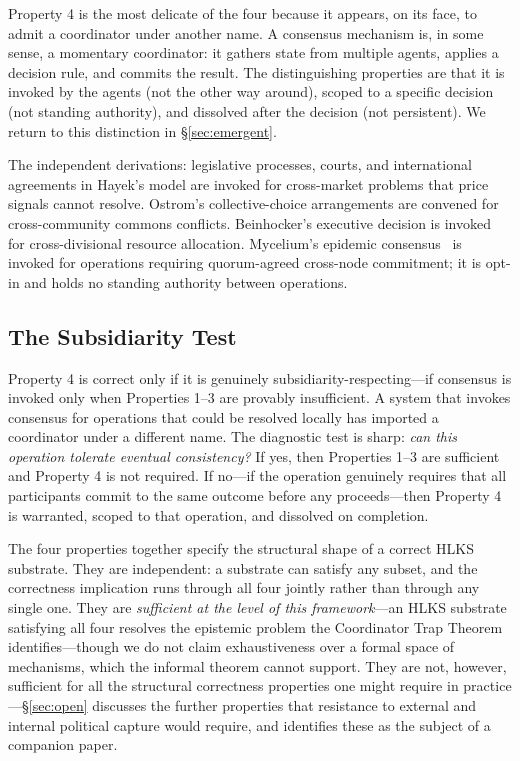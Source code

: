 \documentclass[11pt]{article}
\theoremstyle{definition}
\theoremstyle{plain}
\theoremstyle{plain}
\begin{document}
Property 4 is the most delicate of the four because it appears, on its face,
to admit a coordinator under another name. A consensus mechanism is, in some
sense, a momentary coordinator: it gathers state from multiple agents, applies
a decision rule, and commits the result. The distinguishing properties are
that it is invoked by the agents (not the other way around), scoped to a
specific decision (not standing authority), and dissolved after the decision
(not persistent). We return to this distinction in \S\ref{sec:emergent}.

The independent derivations: legislative processes, courts, and international
agreements in Hayek's model are invoked for cross-market problems that price
signals cannot resolve. Ostrom's collective-choice arrangements are convened
for cross-community commons conflicts. Beinhocker's executive decision is
invoked for cross-divisional resource allocation. Mycelium's epidemic
consensus~\cite{nicholson2026} is invoked for operations requiring
quorum-agreed cross-node commitment; it is opt-in and holds no standing
authority between operations.

\subsection{The Subsidiarity Test}

Property 4 is correct only if it is genuinely subsidiarity-respecting---if
consensus is invoked only when Properties 1--3 are provably insufficient. A
system that invokes consensus for operations that could be resolved locally
has imported a coordinator under a different name. The diagnostic test is
sharp: \emph{can this operation tolerate eventual consistency?} If yes, then
Properties 1--3 are sufficient and Property 4 is not required. If no---if the
operation genuinely requires that all participants commit to the same outcome
before any proceeds---then Property 4 is warranted, scoped to that operation,
and dissolved on completion.

The four properties together specify the structural shape of a correct HLKS
substrate. They are independent: a substrate can satisfy any subset, and the
correctness implication runs through all four jointly rather than through any
single one. They are \emph{sufficient at the level of this framework}---an HLKS
substrate satisfying all four resolves the epistemic problem the Coordinator Trap
Theorem identifies---though we do not claim exhaustiveness over a formal space of
mechanisms, which the informal theorem cannot support. They are not, however, sufficient for all the structural
correctness properties one might require in practice---\S\ref{sec:open}
discusses the further properties that resistance to external and internal
political capture would require, and identifies these as the subject of a
companion paper.
\end{document}

